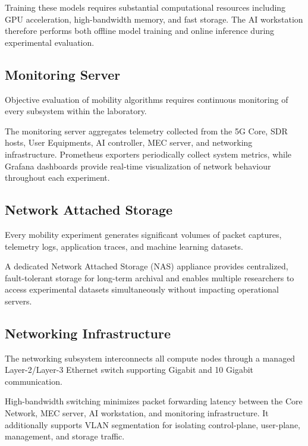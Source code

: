 \documentclass[12pt,a4paper]{article}\usepackage[a4paper,margin=1in]{geometry}\usepackage{graphicx}\usepackage{longtable}\usepackage{booktabs}\usepackage{hyperref}\usepackage{enumitem}\usepackage{amsmath}\usepackage{tikz}\usepackage{pgfgantt}\usepackage{setspace}\setstretch{1.15}\usetikzlibrary{positioning,arrows.meta,shapes.geometric}
\begin{document}
	Training these models requires substantial computational resources including GPU acceleration, high-bandwidth memory, and fast storage. The AI workstation therefore performs both offline model training and online inference during experimental evaluation.
	
	
	\subsection{Monitoring Server}
	
	Objective evaluation of mobility algorithms requires continuous monitoring of every subsystem within the laboratory.
	
	The monitoring server aggregates telemetry collected from the 5G Core, SDR hosts, User Equipments, AI controller, MEC server, and networking infrastructure. Prometheus exporters periodically collect system metrics, while Grafana dashboards provide real-time visualization of network behaviour throughout each experiment.
	
	
	\subsection{Network Attached Storage}
	
	Every mobility experiment generates significant volumes of packet captures, telemetry logs, application traces, and machine learning datasets.
	
	A dedicated Network Attached Storage (NAS) appliance provides centralized, fault-tolerant storage for long-term archival and enables multiple researchers to access experimental datasets simultaneously without impacting operational servers.
	
	
	\subsection{Networking Infrastructure}
	
	The networking subsystem interconnects all compute nodes through a managed Layer-2/Layer-3 Ethernet switch supporting Gigabit and 10 Gigabit communication.
	
	High-bandwidth switching minimizes packet forwarding latency between the Core Network, MEC server, AI workstation, and monitoring infrastructure. It additionally supports VLAN segmentation for isolating control-plane, user-plane, management, and storage traffic.
	
\end{document}
